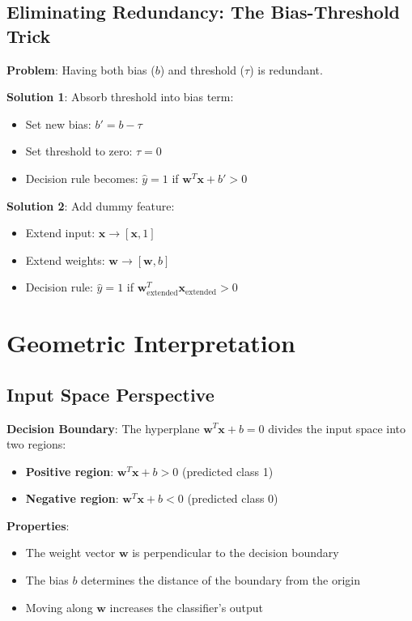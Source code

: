 \subsection{Eliminating Redundancy: The Bias-Threshold Trick}

\textbf{Problem}: Having both bias ($b$) and threshold ($\tau$) is redundant.

\textbf{Solution 1}: Absorb threshold into bias term:
\begin{itemize}
    \item Set new bias: $b' = b - \tau$
    \item Set threshold to zero: $\tau = 0$
    \item Decision rule becomes: $\hat{y} = 1$ if $\bm{w}^T\bm{x} + b' > 0$
\end{itemize}

\textbf{Solution 2}: Add dummy feature:
\begin{itemize}
    \item Extend input: $\bm{x} \rightarrow [\bm{x}, 1]$
    \item Extend weights: $\bm{w} \rightarrow [\bm{w}, b]$
    \item Decision rule: $\hat{y} = 1$ if $\bm{w}_{\text{extended}}^T \bm{x}_{\text{extended}} > 0$
\end{itemize}

\section{Geometric Interpretation}

\subsection{Input Space Perspective}

\textbf{Decision Boundary}: The hyperplane $\bm{w}^T\bm{x} + b = 0$ divides the input space into two regions:
\begin{itemize}
    \item \textbf{Positive region}: $\bm{w}^T\bm{x} + b > 0$ (predicted class 1)
    \item \textbf{Negative region}: $\bm{w}^T\bm{x} + b < 0$ (predicted class 0)
\end{itemize}

\textbf{Properties}:
\begin{itemize}
    \item The weight vector $\bm{w}$ is perpendicular to the decision boundary
    \item The bias $b$ determines the distance of the boundary from the origin
    \item Moving along $\bm{w}$ increases the classifier's output
\end{itemize}

